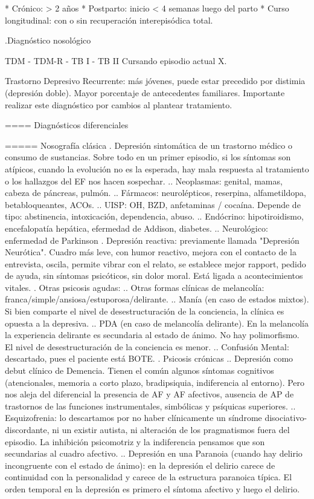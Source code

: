 * Crónico: > 2 años
* Postparto: inicio < 4 semanas luego del parto
* Curso longitudinal: con o sin recuperación interepisódica total.

.Diagnóstico nosológico

TDM - TDM-R - TB I - TB II
Cursando episodio actual X.

Trastorno Depresivo Recurrente: más jóvenes, puede estar precedido por distimia (depresión doble). Mayor porcentaje de antecedentes familiares. Importante realizar este diagnóstico por cambios al plantear tratamiento.

==== Diagnósticos diferenciales

===== Nosografía clásica
. Depresión sintomática de un trastorno médico o consumo de sustancias. Sobre todo en un primer episodio, si los síntomas son atípicos, cuando la evolución no es la esperada, hay mala respuesta al tratamiento o los hallazgos del EF nos hacen sospechar.
.. Neoplasmas: genital, mamas, cabeza de páncreas, pulmón.
.. Fármacos: neurolépticos, reserpina, alfametildopa, betabloqueantes, ACOs.
.. UISP: OH, BZD, anfetaminas / cocaína. Depende de tipo: abstinencia, intoxicación, dependencia, abuso.
.. Endócrino: hipotiroidismo, encefalopatía hepática, efermedad de Addison, diabetes.
.. Neurológico: enfermedad de Parkinson
. Depresión reactiva: previamente llamada "Depresión Neurótica". Cuadro más leve, con humor reactivo, mejora con el  contacto de la entrevista, oscila, permite vibrar con el relato, se establece mejor rapport, pedido de ayuda, sin síntomas psicóticos, sin dolor moral. Está ligada a acontecimientos vitales.
. Otras psicosis agudas:
.. Otras formas clínicas de melancolía: franca/simple/ansiosa/estuporosa/delirante.
.. Manía (en caso de estados mixtos). Si bien comparte el nivel de desestructuración de la conciencia, la clínica es opuesta a la depresiva.
.. PDA (en caso de melancolía delirante). En la melancolía la experiencia delirante es secundaria al estado de ánimo. No hay polimorfismo. El nivel de desestructuración de la conciencia es menor.
.. Confusión Mental: descartado, pues el paciente está BOTE.
. Psicosis crónicas
.. Depresión como debut clínico de Demencia. Tienen el común algunos síntomas cognitivos (atencionales, memoria a corto plazo, bradipsiquia, indiferencia al entorno). Pero nos aleja del diferencial la presencia de AF y AF afectivos, ausencia de AP de trastornos de las funciones instrumentales, simbólicas y psíquicas superiores.
.. Esquizofrenia: lo descartamos por no haber clínicamente un síndrome disociativo-discordante, ni un existir autista, ni alteración de los pragmatismos fuera del episodio. La inhibición psicomotriz y la indiferencia pensamos que son secundarias al cuadro afectivo.
.. Depresión en una Paranoia (cuando hay delirio incongruente con el estado de ánimo): en la depresión el delirio carece de continuidad con la personalidad y carece de la estructura paranoica típica. El orden temporal en la depresión es primero el síntoma afectivo y luego el delirio.

